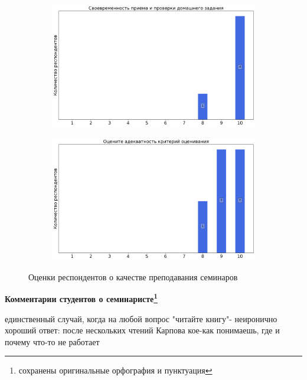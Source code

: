 \begin{figure}[H]
\begin{subfigure}[b]{0.45\textwidth}
                \includegraphics[width=\textwidth]{images/2 course/Компьютерные технологии/seminarists-marks-Красильников Н.И.-2.png}
            \end{subfigure}
            \begin{subfigure}[b]{0.45\textwidth}
                \centering
                \includegraphics[width=\textwidth]{images/2 course/Компьютерные технологии/seminarists-marks-Красильников Н.И.-3.png}
            \end{subfigure}	
            \caption{Оценки респондентов о качестве преподавания семинаров}
        \end{figure}

        \textbf{Комментарии студентов о семинаристе\protect\footnote{сохранены оригинальные орфография и пунктуация}}
            \begin{commentbox} 
                единственный случай, когда на любой вопрос "читайте книгу"- неиронично хороший ответ: после нескольких чтений Карпова кое-как понимаешь, где и почему что-то не работает 
            \end{commentbox}


